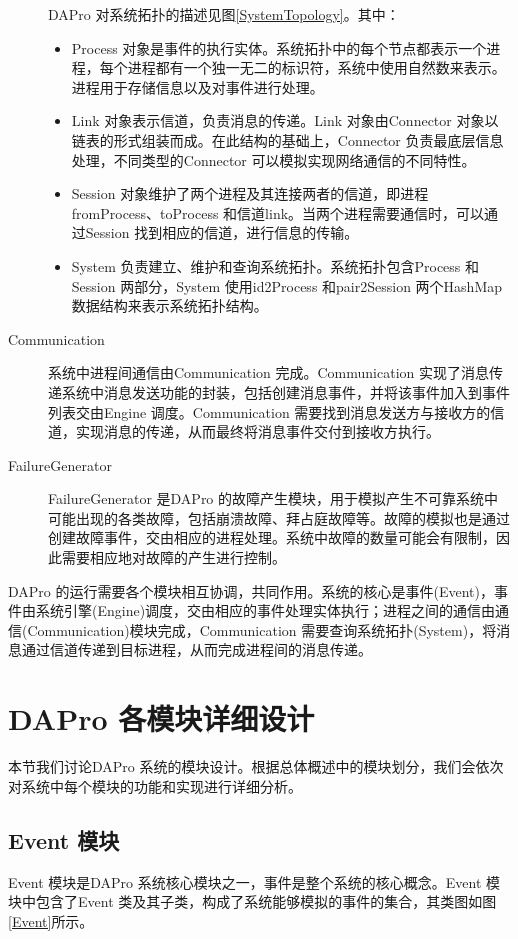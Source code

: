 \begin{description}
            DAPro 对系统拓扑的描述见图\ref{SystemTopology}。其中：
            \begin{itemize}
                \item Process 对象是事件的执行实体。系统拓扑中的每个节点都表示一个进程，每个进程都有一个独一无二的标识符，系统中使用自然数来表示。进程用于存储信息以及对事件进行处理。
                \item Link 对象表示信道，负责消息的传递。Link 对象由Connector 对象以链表的形式组装而成。在此结构的基础上，Connector 负责最底层信息处理，不同类型的Connector 可以模拟实现网络通信的不同特性。
                \item Session 对象维护了两个进程及其连接两者的信道，即进程fromProcess、toProcess 和信道link。当两个进程需要通信时，可以通过Session 找到相应的信道，进行信息的传输。
                \item System 负责建立、维护和查询系统拓扑。系统拓扑包含Process 和Session 两部分，System 使用id2Process 和pair2Session 两个HashMap 数据结构来表示系统拓扑结构。
            \end{itemize}
        
        \item[Communication] 系统中进程间通信由Communication 完成。Communication 实现了消息传递系统中消息发送功能的封装，包括创建消息事件，并将该事件加入到事件列表交由Engine 调度。Communication 需要找到消息发送方与接收方的信道，实现消息的传递，从而最终将消息事件交付到接收方执行。
        
        \item[FailureGenerator] FailureGenerator 是DAPro 的故障产生模块，用于模拟产生不可靠系统中可能出现的各类故障，包括崩溃故障、拜占庭故障等。故障的模拟也是通过创建故障事件，交由相应的进程处理。系统中故障的数量可能会有限制，因此需要相应地对故障的产生进行控制。
    \end{description}

    DAPro 的运行需要各个模块相互协调，共同作用。系统的核心是事件(Event)，事件由系统引擎(Engine)调度，交由相应的事件处理实体执行；进程之间的通信由通信(Communication)模块完成，Communication 需要查询系统拓扑(System)，将消息通过信道传递到目标进程，从而完成进程间的消息传递。

    \section{DAPro 各模块详细设计}
    本节我们讨论DAPro 系统的模块设计。根据总体概述中的模块划分，我们会依次对系统中每个模块的功能和实现进行详细分析。

    \subsection{Event 模块}
    Event 模块是DAPro 系统核心模块之一，事件是整个系统的核心概念。Event 模块中包含了Event 类及其子类，构成了系统能够模拟的事件的集合，其类图如图\ref{Event}所示。

